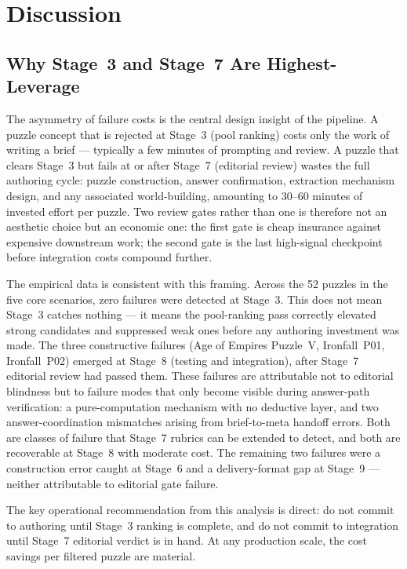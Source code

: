 \section{Discussion}

\subsection{Why Stage~3 and Stage~7 Are Highest-Leverage}

The asymmetry of failure costs is the central design insight of the pipeline. A puzzle concept that is rejected at Stage~3 (pool ranking) costs only the work of writing a brief — typically a few minutes of prompting and review. A puzzle that clears Stage~3 but fails at or after Stage~7 (editorial review) wastes the full authoring cycle: puzzle construction, answer confirmation, extraction mechanism design, and any associated world-building, amounting to 30–60 minutes of invested effort per puzzle. Two review gates rather than one is therefore not an aesthetic choice but an economic one: the first gate is cheap insurance against expensive downstream work; the second gate is the last high-signal checkpoint before integration costs compound further.

The empirical data is consistent with this framing. Across the 52 puzzles in the five core scenarios, zero failures were detected at Stage~3. This does not mean Stage~3 catches nothing — it means the pool-ranking pass correctly elevated strong candidates and suppressed weak ones before any authoring investment was made. The three constructive failures (Age of Empires Puzzle~V, Ironfall~P01, Ironfall~P02) emerged at Stage~8 (testing and integration), after Stage~7 editorial review had passed them. These failures are attributable not to editorial blindness but to failure modes that only become visible during answer-path verification: a pure-computation mechanism with no deductive layer, and two answer-coordination mismatches arising from brief-to-meta handoff errors. Both are classes of failure that Stage~7 rubrics can be extended to detect, and both are recoverable at Stage~8 with moderate cost. The remaining two failures were a construction error caught at Stage~6 and a delivery-format gap at Stage~9 — neither attributable to editorial gate failure.

The key operational recommendation from this analysis is direct: do not commit to authoring until Stage~3 ranking is complete, and do not commit to integration until Stage~7 editorial verdict is in hand. At any production scale, the cost savings per filtered puzzle are material.

